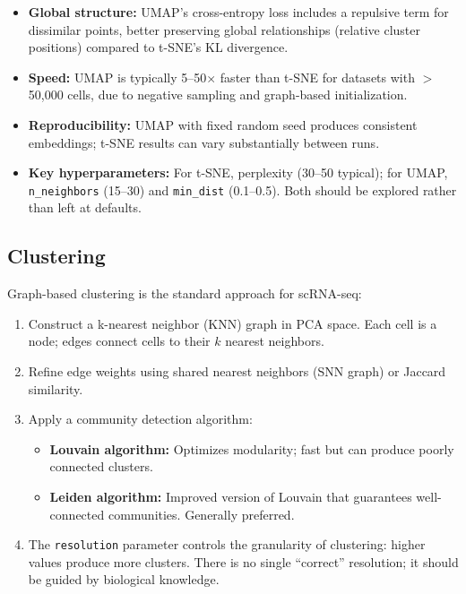 \begin{keyconcept}[title={t-SNE vs.\ UMAP: Key Differences}]
\begin{itemize}[nosep]
  \item \textbf{Global structure:} UMAP's cross-entropy loss includes a
    repulsive term for dissimilar points, better preserving global relationships
    (relative cluster positions) compared to t-SNE's KL divergence.
  \item \textbf{Speed:} UMAP is typically 5--50$\times$ faster than t-SNE for
    datasets with $>$50,000 cells, due to negative sampling and graph-based
    initialization.
  \item \textbf{Reproducibility:} UMAP with fixed random seed produces
    consistent embeddings; t-SNE results can vary substantially between runs.
  \item \textbf{Key hyperparameters:} For t-SNE, perplexity (30--50 typical);
    for UMAP, \texttt{n\_neighbors} (15--30) and \texttt{min\_dist}
    (0.1--0.5). Both should be explored rather than left at defaults.
\end{itemize}
\end{keyconcept}

\subsection{Clustering}

Graph-based clustering is the standard approach for scRNA-seq:

\begin{enumerate}[nosep]
  \item Construct a k-nearest neighbor (KNN) graph in PCA space. Each cell is a
    node; edges connect cells to their $k$ nearest neighbors.
  \item Refine edge weights using shared nearest neighbors (SNN graph) or
    Jaccard similarity.
  \item Apply a community detection algorithm:
    \begin{itemize}[nosep]
      \item \textbf{Louvain algorithm:} Optimizes modularity; fast but can
        produce poorly connected clusters.
      \item \textbf{Leiden algorithm:} Improved version of Louvain that
        guarantees well-connected communities. Generally preferred.
    \end{itemize}
  \item The \texttt{resolution} parameter controls the granularity of
    clustering: higher values produce more clusters. There is no single
    ``correct'' resolution; it should be guided by biological knowledge.
\end{enumerate}

